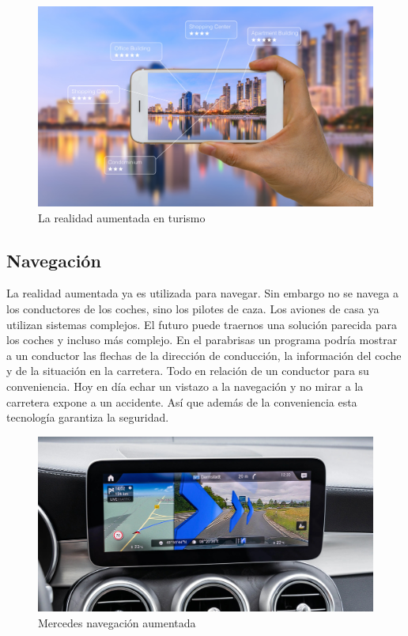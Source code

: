 \documentclass[a4paper,11pt]{scrartcl}
\begin{document}
 
\begin{figure}[h]
    \centering
    \includegraphics[width=0.7\linewidth]{augmented}
    \caption{La realidad aumentada en turismo \cite{imgaugmented}}
\end{figure}
 
\subsection{Navegación}
La realidad aumentada ya es utilizada para navegar. Sin embargo no se navega a los conductores de los coches, sino los pilotes de caza. Los aviones de casa ya utilizan sistemas complejos. El futuro puede traernos una solución parecida para los coches y incluso más complejo. En el parabrisas un programa podría mostrar a un conductor las flechas de la dirección de conducción, la información del coche y de la situación en la carretera. Todo en relación de un conductor para su conveniencia. Hoy en día echar un vistazo a la navegación y no mirar a la carretera expone a un accidente. Así que además de la conveniencia esta tecnología garantiza la seguridad.

\begin{figure}[h]
    \centering
    \includegraphics[width=0.7\linewidth]{mercedesnavigation}
    \caption{Mercedes navegación aumentada \cite{imgmercedesnavigation}}
\end{figure}
 
 
\end{document}
